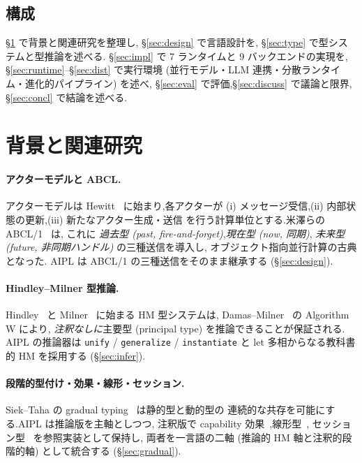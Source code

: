 \documentclass[11pt,a4paper]{article}
\newcommand{\code}[1]{\texttt{\small #1}}
\begin{document}
\subsection{構成}
\S\ref{sec:related} で背景と関連研究を整理し,
\S\ref{sec:design} で言語設計を,
\S\ref{sec:type} で型システムと型推論を述べる.
\S\ref{sec:impl} で 7 ランタイムと 9 バックエンドの実現を,
\S\ref{sec:runtime}--\S\ref{sec:dist} で実行環境
(並行モデル・LLM 連携・分散ランタイム・進化的パイプライン) を述べ,
\S\ref{sec:eval} で評価,\S\ref{sec:discuss} で議論と限界,
\S\ref{sec:concl} で結論を述べる.

\section{背景と関連研究}\label{sec:related}

\paragraph{アクターモデルと ABCL.}
アクターモデルは Hewitt~\cite{hewitt} に始まり,各アクターが
(i) メッセージ受信,(ii) 内部状態の更新,(iii) 新たなアクター生成・送信
を行う計算単位とする.米澤らの ABCL/1~\cite{abcl1} は,
これに \emph{過去型 (past, fire-and-forget)},\emph{現在型 (now, 同期)},
\emph{未来型 (future, 非同期ハンドル)} の三種送信を導入し,
オブジェクト指向並行計算の古典となった.
AIPL は ABCL/1 の三種送信をそのまま継承する (\S\ref{sec:design}).

\paragraph{Hindley--Milner 型推論.}
Hindley~\cite{hindley} と Milner~\cite{milner} に始まる HM 型システムは,
Damas--Milner~\cite{damas} の Algorithm \textsf{W} により,
\emph{注釈なしに}主要型 (principal type) を推論できることが保証される.
AIPL の推論器は \code{unify} / \code{generalize} / \code{instantiate} と
let 多相からなる教科書的 HM を採用する (\S\ref{sec:infer}).

\paragraph{段階的型付け・効果・線形・セッション.}
Siek--Taha の gradual typing~\cite{gradual} は静的型と動的型の
連続的な共存を可能にする.AIPL は推論版を主軸としつつ,
注釈版で capability 効果~\cite{capability},線形型~\cite{linear},
セッション型~\cite{session} を参照実装として保持し,
両者を一言語の二軸 (推論的 HM 軸と注釈的段階的軸) として統合する
(\S\ref{sec:gradual}).
\end{document}

